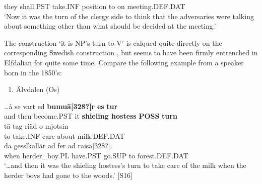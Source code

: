 they  shall.PST  take.INF  position  to  on  meeting.DEF.DAT\\ %


‘Now it was the turn of the clergy side to think that the adversaries were talking about something other than what should be decided at the meeting.’ 
\z


The construction  ‘it is NP’s turn to V’ is calqued quite directly on the corresponding Swedish construction , but seems to have been firmly entrenched in Elfdalian for quite some time. Compare the following example from a speaker born in the 1850’s:

\begin{enumerate} %
\item 
\label{bkm:Ref135470154}Älvdalen (Os)

\end{enumerate} %
\ea\label{}
\gll …å  se  vart  ed  \textbf{bumuä[328?]r} \textbf{es} \textbf{tur}\\


and  then  become.PST  it  \textbf{shieling hostess} \textbf{POSS} \textbf{turn}\\ %


\ea\label{}
\gll tä  tag  riäd   o  mjotsin\\


to  take.INF  care  about  milk.DEF.DAT\\ %


\ea\label{}
\gll da  gesslkallär  ad  fer  ad  raisä[328?].\\


when  herder\_boy.PL  have.PST  go.SUP  to  forest.DEF.DAT\\ %


‘…and then it was the shieling hostess’s turn to take care of the milk when the herder boys had gone to the woods.’ [S16]
\z

